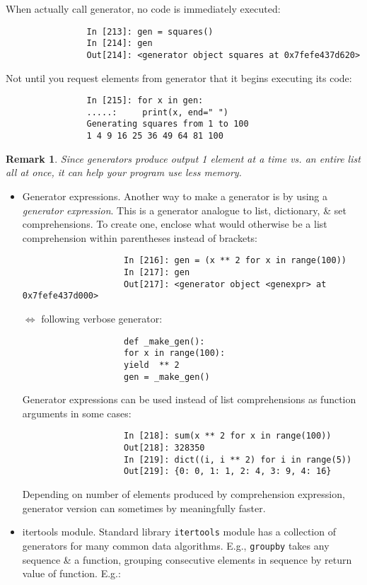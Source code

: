 \documentclass{article}
\newtheorem{remark}{Remark}
\begin{document}
\begin{itemize}
\begin{itemize}
\begin{itemize}
			When actually call generator, no code is immediately executed:
			\begin{verbatim}
				In [213]: gen = squares()
				In [214]: gen
				Out[214]: <generator object squares at 0x7fefe437d620>
			\end{verbatim}
			Not until you request elements from generator that it begins executing its code:
			\begin{verbatim}
				In [215]: for x in gen:
				.....:     print(x, end=" ")
				Generating squares from 1 to 100
				1 4 9 16 25 36 49 64 81 100
			\end{verbatim}
			
			\begin{remark}
				Since generators produce output 1 element at a time vs. an entire list all at once, it can help your program use less memory.
			\end{remark}
			\begin{itemize}
				\item {\sf Generator expressions.} Another way to make a generator is by using a {\it generator expression}. This is a generator analogue to list, dictionary, \& set comprehensions. To create one, enclose what would otherwise be a list comprehension within parentheses instead of brackets:
				\begin{verbatim}
					In [216]: gen = (x ** 2 for x in range(100))
					In [217]: gen
					Out[217]: <generator object <genexpr> at 0x7fefe437d000>
				\end{verbatim}
				$\Leftrightarrow$ following verbose generator:
				\begin{verbatim}
					def _make_gen():
					for x in range(100):
					yield  ** 2
					gen = _make_gen()
				\end{verbatim}
				Generator expressions can be used instead of list comprehensions as function arguments in some cases:
				\begin{verbatim}
					In [218]: sum(x ** 2 for x in range(100))
					Out[218]: 328350
					In [219]: dict((i, i ** 2) for i in range(5))
					Out[219]: {0: 0, 1: 1, 2: 4, 3: 9, 4: 16}
				\end{verbatim}
				Depending on number of elements produced by comprehension expression, generator version can sometimes by meaningfully faster.
				\item {\sf itertools module.} Standard library {\tt itertools} module has a collection of generators for many common data algorithms. E.g., {\tt groupby} takes any sequence \& a function, grouping consecutive elements in sequence by return value of function. E.g.:

\end{itemize}
\end{itemize}
\end{itemize}
\end{itemize}
\end{document}
